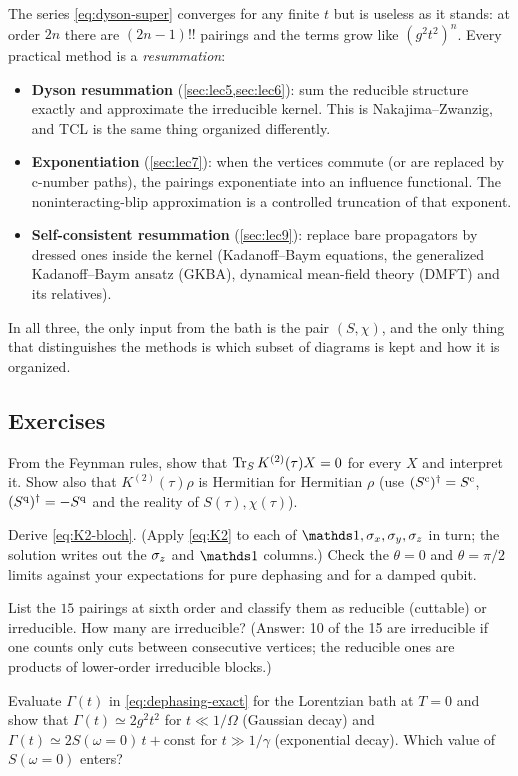 The series \eqref{eq:dyson-super} converges for any finite $t$ but is useless as it stands: at order $2n$ there are $(2n-1)!!$ pairings and the terms grow like $(g^2t^2)^n$.
Every practical method is a \emph{resummation}:
\begin{itemize}[itemsep=1pt]
\item \textbf{Dyson resummation} (\cref{sec:lec5,sec:lec6}): sum the reducible structure exactly and approximate the irreducible kernel.
  This is Nakajima--Zwanzig, and TCL is the same thing organized differently.
\item \textbf{Exponentiation} (\cref{sec:lec7}): when the vertices commute (or are replaced by c-number paths), the pairings exponentiate into an influence functional.
  The noninteracting-blip approximation is a controlled truncation of that exponent.
\item \textbf{Self-consistent resummation} (\cref{sec:lec9}): replace bare propagators by dressed ones inside the kernel (Kadanoff--Baym equations, the generalized Kadanoff--Baym ansatz (GKBA), dynamical mean-field theory (DMFT) and its relatives).
\end{itemize}
In all three, the only input from the bath is the pair $(S,\chi)$, and the only thing that distinguishes the methods is which subset of diagrams is kept and how it is organized.

\subsection{Exercises}

\begin{exercise}\label{ex:4-1}
From the Feynman rules, show that $\operatorname{Tr}_S K^{(2)}(\tau)X=0$ for every $X$ and interpret it.
Show also that $K^{(2)}(\tau)\rho$ is Hermitian for Hermitian $\rho$ (use $(S^{\mathrm{c}})^\dagger=S^{\mathrm{c}}$, $(S^{\mathrm{q}})^\dagger=-S^{\mathrm{q}}$ and the reality of $S(\tau),\chi(\tau)$).
\end{exercise}

\begin{exercise}\label{ex:4-2}
Derive \cref{eq:K2-bloch}.
(Apply \cref{eq:K2} to each of $\Id,\sx,\sy,\sz$ in turn; the solution writes out the $\sigma_z$ and $\Id$ columns.)
Check the $\theta=0$ and $\theta=\pi/2$ limits against your expectations for pure dephasing and for a damped qubit.
\end{exercise}

\begin{exercise}\label{ex:4-3}
List the $15$ pairings at sixth order and classify them as reducible (cuttable) or irreducible.
How many are irreducible?
(Answer: 10 of the 15 are irreducible if one counts only cuts between consecutive vertices; the reducible ones are products of lower-order irreducible blocks.)
\end{exercise}

\begin{exercise}\label{ex:4-4}
Evaluate $\Gamma(t)$ in \cref{eq:dephasing-exact} for the Lorentzian bath at $T=0$ and show that $\Gamma(t)\simeq 2g^2t^2$ for $t\ll1/\Omega$ (Gaussian decay) and $\Gamma(t)\simeq2S(\omega{=}0)\,t+\text{const}$ for $t\gg1/\gamma$ (exponential decay).
Which value of $S(\omega{=}0)$ enters?
\end{exercise}

\clearpage
